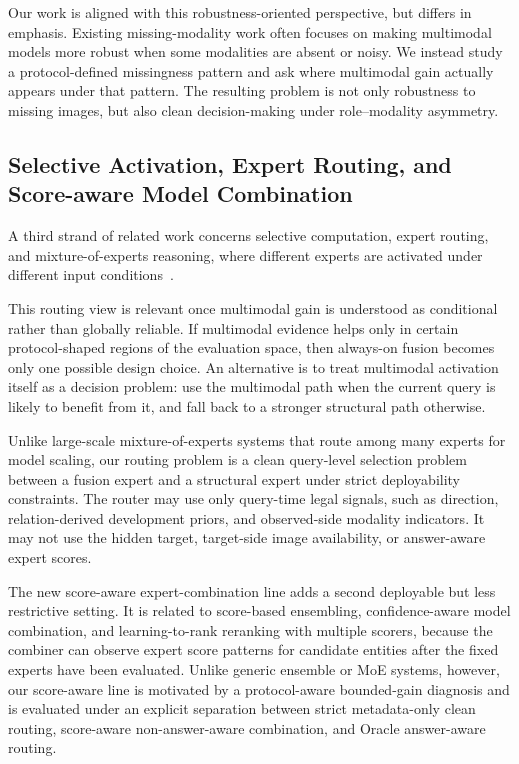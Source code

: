 \documentclass[11pt]{article}
\begin{document}
Our work is aligned with this robustness-oriented perspective, but differs in emphasis. Existing missing-modality work often focuses on making multimodal models more robust when some modalities are absent or noisy. We instead study a protocol-defined missingness pattern and ask where multimodal gain actually appears under that pattern. The resulting problem is not only robustness to missing images, but also clean decision-making under role--modality asymmetry.

\subsection{Selective Activation, Expert Routing, and Score-aware Model Combination}
A third strand of related work concerns selective computation, expert routing, and mixture-of-experts reasoning, where different experts are activated under different input conditions~\cite{jacobs1991adaptive,jordan1994hierarchical,shazeer2017outrageously,lepikhin2021gshard,fedus2022switch}.

This routing view is relevant once multimodal gain is understood as conditional rather than globally reliable. If multimodal evidence helps only in certain protocol-shaped regions of the evaluation space, then always-on fusion becomes only one possible design choice. An alternative is to treat multimodal activation itself as a decision problem: use the multimodal path when the current query is likely to benefit from it, and fall back to a stronger structural path otherwise.

Unlike large-scale mixture-of-experts systems that route among many experts for model scaling, our routing problem is a clean query-level selection problem between a fusion expert and a structural expert under strict deployability constraints. The router may use only query-time legal signals, such as direction, relation-derived development priors, and observed-side modality indicators. It may not use the hidden target, target-side image availability, or answer-aware expert scores.

The new score-aware expert-combination line adds a second deployable but less restrictive setting. It is related to score-based ensembling, confidence-aware model combination, and learning-to-rank reranking with multiple scorers, because the combiner can observe expert score patterns for candidate entities after the fixed experts have been evaluated. Unlike generic ensemble or MoE systems, however, our score-aware line is motivated by a protocol-aware bounded-gain diagnosis and is evaluated under an explicit separation between strict metadata-only clean routing, score-aware non-answer-aware combination, and Oracle answer-aware routing.
\end{document}
